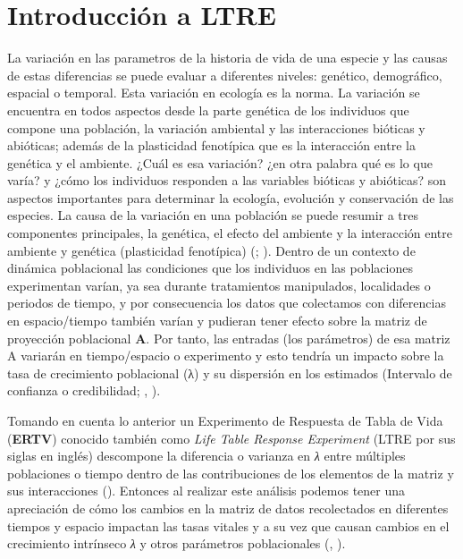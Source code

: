 \documentclass[
]{book}
\theoremstyle{definition}
\theoremstyle{definition}
\theoremstyle{definition}
\theoremstyle{definition}
\theoremstyle{remark}
\begin{document}
\section{Introducción a LTRE}\label{introducciuxf3n-a-ltre}

La variación en las parametros de la historia de vida de una especie y las causas de estas diferencias se puede evaluar a diferentes niveles: genético, demográfico, espacial o temporal. Esta variación en ecología es la norma. La variación se encuentra en todos aspectos desde la parte genética de los individuos que compone una población, la variación ambiental y las interacciones bióticas y abióticas; además de la plasticidad fenotípica que es la interacción entre la genética y el ambiente. ¿Cuál es esa variación? ¿en otra palabra qué es lo que varía? y ¿cómo los individuos responden a las variables bióticas y abióticas? son aspectos importantes para determinar la ecología, evolución y conservación de las especies. La causa de la variación en una población se puede resumir a tres componentes principales, la genética, el efecto del ambiente y la interacción entre ambiente y genética (plasticidad fenotípica) (\citet{hastings2021effects}; \citet{sun2019multivariate}). Dentro de un contexto de dinámica poblacional las condiciones que los individuos en las poblaciones experimentan varían, ya sea durante tratamientos manipulados, localidades o periodos de tiempo, y por consecuencia los datos que colectamos con diferencias en espacio/tiempo también varían y pudieran tener efecto sobre la matriz de proyección poblacional \textbf{A}. Por tanto, las entradas (los parámetros) de esa matriz A variarán en tiempo/espacio o experimento y esto tendría un impacto sobre la tasa de crecimiento poblacional (λ) y su dispersión en los estimados (Intervalo de confianza o credibilidad; \citet{caswell2000matrix}, \citet{caswell2010life}).

Tomando en cuenta lo anterior un Experimento de Respuesta de Tabla de Vida (\textbf{ERTV}) conocido también como \emph{Life Table Response Experiment} (LTRE por sus siglas en inglés) descompone la diferencia o varianza en \emph{λ} entre múltiples poblaciones o tiempo dentro de las contribuciones de los elementos de la matriz y sus interacciones (\citet{caswell1989analysis}). Entonces al realizar este análisis podemos tener una apreciación de cómo los cambios en la matriz de datos recolectados en diferentes tiempos y espacio impactan las tasas vitales y a su vez que causan cambios en el crecimiento intrínseco \emph{λ} y otros parámetros poblacionales (\citet{caswell1989analysis}, \citet{caswell2010life}).
\end{document}
